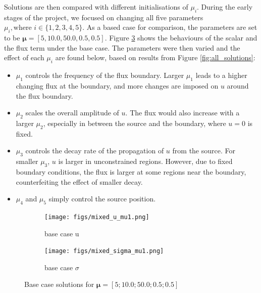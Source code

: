 Solutions are then compared with different initialisations of $\mu_i$. During the early stages of the project, we focused on changing all five parameters $\mu_i, \text{where } i \in \{1, 2, 3, 4, 5\}$.  As a based case for comparison, the parameters are set to be $\bm{\mu} = [5, 10.0, 50.0, 0.5, 0.5]$. Figure \ref{fig: base} shows the behaviours of the scalar and the flux term under the base case. The parameters were then varied and the effect of each $\mu_i$ are found below, based on results from Figure \ref{fig:all_solutions}:

\begin{itemize}
    \item $\mu_1$ controls the frequency of the flux boundary. Larger $\mu_1$ leads to a higher changing flux at the boundary, and more changes are imposed on $u$ around the flux boundary.  
    \item $\mu_2$ scales the overall amplitude of $u$. The flux would also increase with a  larger $\mu_2$, especially in between the source and the boundary, where $u = 0$ is fixed. 
    \item $\mu_3$ controls the decay rate of the propagation of $u$ from the source. For smaller $\mu_3$, $u$ is larger in unconstrained regions. However, due to fixed boundary conditions, the flux is larger at some regions near the boundary, counterfeiting the effect of smaller decay.  
    \item $\mu_4$ and $\mu_5$ simply control the source position. 

\end{itemize}

\begin{figure}[!h]
        \begin{center}
	\begin{subfigure}{0.4\linewidth}
		\centering
		\texttt{[image: figs/mixed\_u\_mu1.png]}
            \caption{base case u}
		\label{fig: base_u}
	\end{subfigure}
	\begin{subfigure}{0.4\linewidth}
		\centering
		\texttt{[image: figs/mixed\_sigma\_mu1.png]}
            \caption{base case $\sigma$}
		\label{fig: base_sig}
	\end{subfigure}
	\caption{Base case solutions for $\bm{\mu} = [5; 10.0; 50.0; 0.5; 0.5]$}
	\label{fig: base}
        \end{center}
\end{figure}

